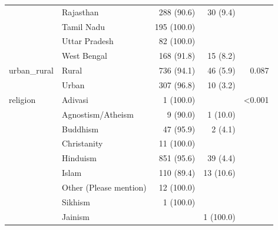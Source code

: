 \documentclass[
]{article}
\begin{document}
\begin{longtable}[]{@{}llrrr@{}}
& Rajasthan & 288 (90.6) & 30 (9.4) & \\
& Tamil Nadu & 195 (100.0) & & \\
& Uttar Pradesh & 82 (100.0) & & \\
& West Bengal & 168 (91.8) & 15 (8.2) & \\
urban\_rural & Rural & 736 (94.1) & 46 (5.9) & 0.087 \\
& Urban & 307 (96.8) & 10 (3.2) & \\
religion & Adivasi & 1 (100.0) & & \textless0.001 \\
& Agnostism/Atheism & 9 (90.0) & 1 (10.0) & \\
& Buddhism & 47 (95.9) & 2 (4.1) & \\
& Christanity & 11 (100.0) & & \\
& Hinduism & 851 (95.6) & 39 (4.4) & \\
& Islam & 110 (89.4) & 13 (10.6) & \\
& Other (Please mention) & 12 (100.0) & & \\
& Sikhism & 1 (100.0) & & \\
& Jainism & & 1 (100.0) & \\
\bottomrule
\end{longtable}
\end{document}

